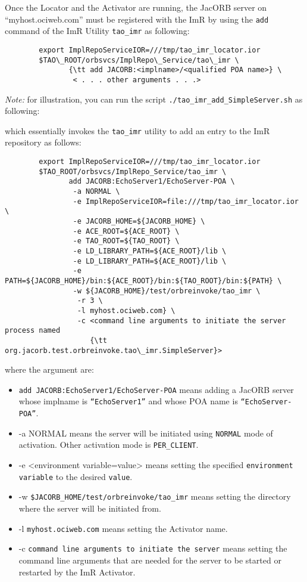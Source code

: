 Once the Locator and the Activator are running, the JacORB server on
“myhost.ociweb.com” must be registered with the ImR by using the
{\tt add} command of the ImR Utility {\tt tao\_imr} as following:

\begin{verbatim}
        export ImplRepoServiceIOR=///tmp/tao_imr_locator.ior
        $TAO\_ROOT/orbsvcs/ImplRepo\_Service/tao\_imr \
               {\tt add JACORB:<implname>/<qualified POA name>} \
                < . . . other arguments . . .>
\end{verbatim}

\emph{Note:} for illustration, you can run the script
{\tt ./tao\_imr\_add\_SimpleServer.sh} as following:


which essentially invokes the {\tt tao\_imr} utility to add an entry to
the ImR repository as follows:

\begin{verbatim}
        export ImplRepoServiceIOR=///tmp/tao_imr_locator.ior
        $TAO_ROOT/orbsvcs/ImplRepo_Service/tao_imr \
               add JACORB:EchoServer1/EchoServer-POA \
                -a NORMAL \
                -e ImplRepoServiceIOR=file:///tmp/tao_imr_locator.ior \
                -e JACORB_HOME=${JACORB_HOME} \
                -e ACE_ROOT=${ACE_ROOT} \
                -e TAO_ROOT=${TAO_ROOT} \
                -e LD_LIBRARY_PATH=${ACE_ROOT}/lib \
                -e LD_LIBRARY_PATH=${ACE_ROOT}/lib \
                -e PATH=${JACORB_HOME}/bin:${ACE_ROOT}/bin:${TAO_ROOT}/bin:${PATH} \
                -w ${JACORB_HOME}/test/orbreinvoke/tao_imr \
                 -r 3 \
                 -l myhost.ociweb.com} \
                 -c <command line arguments to initiate the server process named
                    {\tt org.jacorb.test.orbreinvoke.tao\_imr.SimpleServer}>
\end{verbatim}

where the argument are:
\begin{itemize}
    \item {\tt add JACORB:EchoServer1/EchoServer-POA} means
             adding a JacORB server whose implname is {\tt “EchoServer1”}
             and whose POA name is {\tt “EchoServer-POA”}.
    \item -a NORMAL means the server will be initiated using
             {\tt NORMAL} mode of activation.  Other activation mode
              is {\tt PER\_CLIENT}.
    \item -e <environment variable=value> means setting the specified
              {\tt environment variable} to the desired {\tt value}.
    \item -w {\tt \${JACORB\_HOME}/test/orbreinvoke/tao\_imr} means setting
               the directory where the server will be initiated from.
    \item -l {\tt myhost.ociweb.com} means setting the Activator name.
    \item -c {\tt command line arguments to initiate the server} means
               setting the command line arguments that are needed for the server
               to be started or restarted by the ImR Activator.
\end{itemize}

